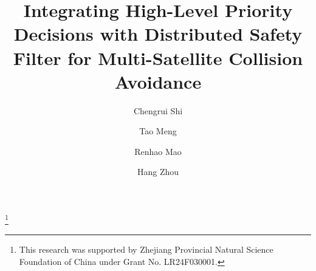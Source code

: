 \documentclass{ifacconf}
\begin{document}
\begin{frontmatter}

\title{Integrating High-Level Priority Decisions with Distributed Safety Filter for Multi-Satellite Collision Avoidance} 

\thanks[footnoteinfo]{This research was supported by Zhejiang Provincial Natural Science Foundation of China under Grant No. LR24F030001.}

\author[First]{Chengrui Shi} 
\author[Second]{Tao Meng} 
\author[First]{Renhao Mao}
\author[First]{Hang Zhou}

\address[First]{School of Aeronautics and Astronautics,  
Zhejiang University, Hangzhou, 310027, China (e-mail: chengruishi,maorh,12324046@zju.edu.cn).}
\address[Second]{Huanjiang Laboratory, 
   Zhuji, 311899, China (e-mail: mengtao@zju.edu.cn)}

\begin{abstract}                %


\end{abstract}
\end{frontmatter}
\end{document}
